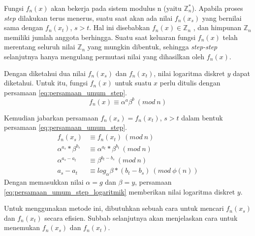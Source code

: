 Fungsi $ f_n (x) $ akan bekerja pada sistem modulus n (yaitu $ \mathbb{Z}_n^* $). Apabila proses \textit{step} dilakukan terus menerus, suatu saat akan ada nilai $ f_n (x_s) $ yang bernilai sama dengan $ f_n (x_t) $, $ s>t $. Hal ini disebabkan $ f_n (x) \in \mathbb{Z}_n $ , dan himpunan $ \mathbb{Z}_n $ memiliki jumlah anggota berhingga. Suatu saat keluaran fungsi $ f_n (x) $ telah merentang seluruh nilai $ \mathbb{Z}_n $ yang mungkin dibentuk, sehingga \textit{step-step} selanjutnya hanya mengulang permutasi nilai yang dihasilkan oleh $ f_n (x) $.\cite{brent_montecarlo}

Dengan diketahui dua nilai $ f_n (x_s) $ dan $ f_n (x_t) $, nilai logaritma diskret $ y $ dapat diketahui. Untuk itu, fungsi $ f_n (x) $ untuk suatu $ x $ perlu ditulis dengan persamaan \eqref{eq:persamaan_umum_step}.
\begin{equation}
f_n (x)\equiv \alpha^a \beta^b\ (mod\ n)
\label{eq:persamaan_umum_step}
\end{equation}

Kemudian jabarkan persamaan $ f_n (x_s)=f_n (x_t) $, $ s>t $ dalam bentuk persamaan \eqref{eq:persamaan_umum_step}.
\begin{align}
f_n (x_s) &\equiv f_n (x_t)\ (mod\ n) \\
\alpha^{a_s} * \beta^{b_s} &\equiv \alpha^{a_t} * \beta^{b_t}\ (mod\ n) \\
\alpha^{a_s-a_t} &\equiv \beta^{b_t-b_s}\ (mod\ n) \\
a_s - a_t &\equiv log_{\alpha} \beta * (b_t - b_s)\ (mod\ \phi(n))
\label{eq:persamaan_umum_step_logaritmik}
\end{align}
Dengan memasukkan nilai $ \alpha=g $ dan $ \beta=y $, persamaan \eqref{eq:persamaan_umum_step_logaritmik} memberikan nilai logaritma diskret $ y $.

Untuk menggunakan metode ini, dibutuhkan sebuah cara untuk mencari $ f_n (x_s) $ dan $ f_n (x_t) $ secara efisien. Subbab selanjutnya akan menjelaskan cara untuk menemukan $ f_n (x_s) $ dan $ f_n (x_t) $.

